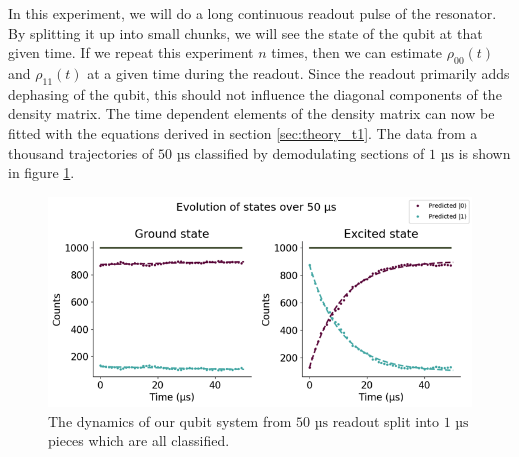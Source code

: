 In this experiment, we will do a long continuous readout pulse of the resonator. By splitting it up into small chunks, we will see the state of the qubit at that given time. If we repeat this experiment $n$ times, then we can estimate $\rho_{00}(t)$ and $\rho_{11}(t)$ at a given time during the readout. Since the readout primarily adds dephasing of the qubit, this should not influence the diagonal components of the density matrix. The time dependent elements of the density matrix can now be fitted with the equations derived in section \ref{sec:theory_t1}. The data from a thousand trajectories of $50 \text{ µs}$ classified by demodulating sections of $1 \text{ µs}$ is shown in figure \ref{fig:continous_calibration_decays}.
\begin{figure}
    \centering
    \includegraphics{Figs/calibrations/contiuous/decays.png}
    \caption{The dynamics of our qubit system from $50 \text{ µs}$ readout split into $1 \text{ µs}$ pieces which are all classified.}
    \label{fig:continous_calibration_decays}
\end{figure}
